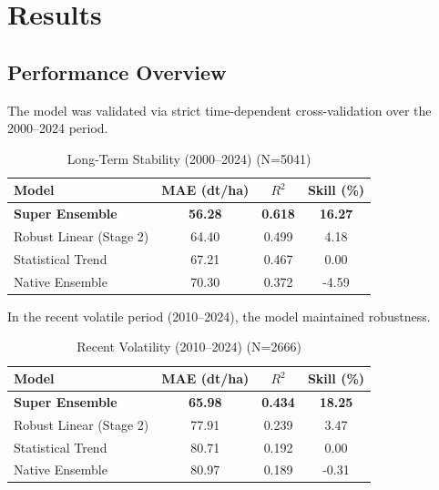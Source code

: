 \section{Results}

\subsection{Performance Overview}
The model was validated via strict time-dependent cross-validation over the 2000--2024 period.

\begin{table}[h]
\centering
\caption{Long-Term Stability (2000--2024) (N=5041)}
\begin{tabular}{|l|c|c|c|}
\hline
\textbf{Model} & \textbf{MAE (dt/ha)} & \textbf{$R^2$} & \textbf{Skill (\%)} \\ \hline
\textbf{Super Ensemble} & \textbf{56.28} & \textbf{0.618} & \textbf{16.27} \\ \hline
Robust Linear (Stage 2) & 64.40 & 0.499 & 4.18 \\ \hline
Statistical Trend & 67.21 & 0.467 & 0.00 \\ \hline
Native Ensemble & 70.30 & 0.372 & -4.59 \\ \hline
\end{tabular}
\end{table}

In the recent volatile period (2010--2024), the model maintained robustness.

\begin{table}[h]
\centering
\caption{Recent Volatility (2010--2024) (N=2666)}
\begin{tabular}{|l|c|c|c|}
\hline
\textbf{Model} & \textbf{MAE (dt/ha)} & \textbf{$R^2$} & \textbf{Skill (\%)} \\ \hline
\textbf{Super Ensemble} & \textbf{65.98} & \textbf{0.434} & \textbf{18.25} \\ \hline
Robust Linear (Stage 2) & 77.91 & 0.239 & 3.47 \\ \hline
Statistical Trend & 80.71 & 0.192 & 0.00 \\ \hline
Native Ensemble & 80.97 & 0.189 & -0.31 \\ \hline
\end{tabular}
\end{table}

